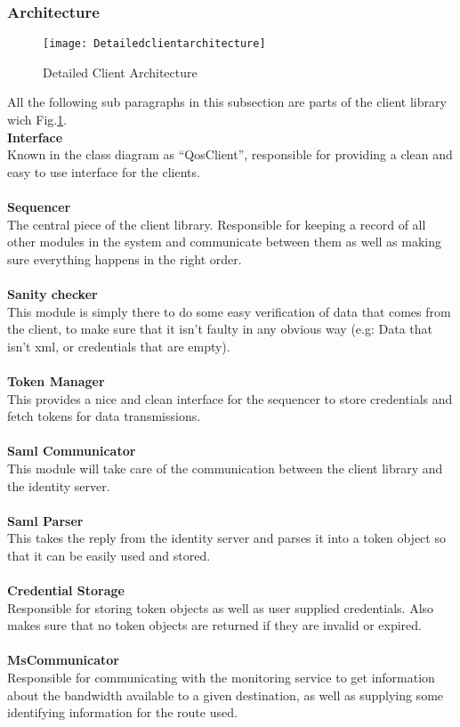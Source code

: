 	\subsubsection{Architecture}\label{client architecture}
		\begin{figure}[h]
			\centering	
			\texttt{[image: Detailedclientarchitecture]}
			\caption{Detailed Client Architecture}
			\label{fig:DetailedClientArchitecture}
		\end{figure}

    All the following sub paragraphs in this subsection are parts of the client library wich Fig.\ref{fig:DetailedClientArchitecture}.  \\ 
    
		\indent \textbf{Interface} \\
Known in the class diagram as “QosClient”, responsible for providing a clean and easy to use interface for the clients.
\\\\
		\indent \textbf{Sequencer} \\
The central piece of the client library. Responsible for keeping a record of all other modules in the system and communicate between them as well as making sure everything happens in the right order.
\\\\
		\indent \textbf{Sanity checker} \\
This module is simply there to do some easy verification of data that comes from the client, to make sure that it isn’t faulty in any obvious way (e.g: Data that isn’t xml, or credentials that are empty).
\\\\
		\indent \textbf{Token Manager} \\
This provides a nice and clean interface for the sequencer to store credentials and fetch tokens for data transmissions.
\\\\
		\indent \textbf{Saml Communicator} \\
This module will take care of the communication between the client library and the identity server.
\\\\
		\indent \textbf{Saml Parser} \\
This takes the reply from the identity server and parses it into a token object so that it can be easily used and stored.
\\\\
		\indent \textbf{Credential Storage} \\
Responsible for storing token objects as well as user supplied credentials. Also makes sure that no token objects are returned if they are invalid or expired.
\\\\
		\indent \textbf{MsCommunicator} \\
Responsible for communicating with the monitoring service to get information about the bandwidth available to a given destination, as well as supplying some identifying information for the route used.


